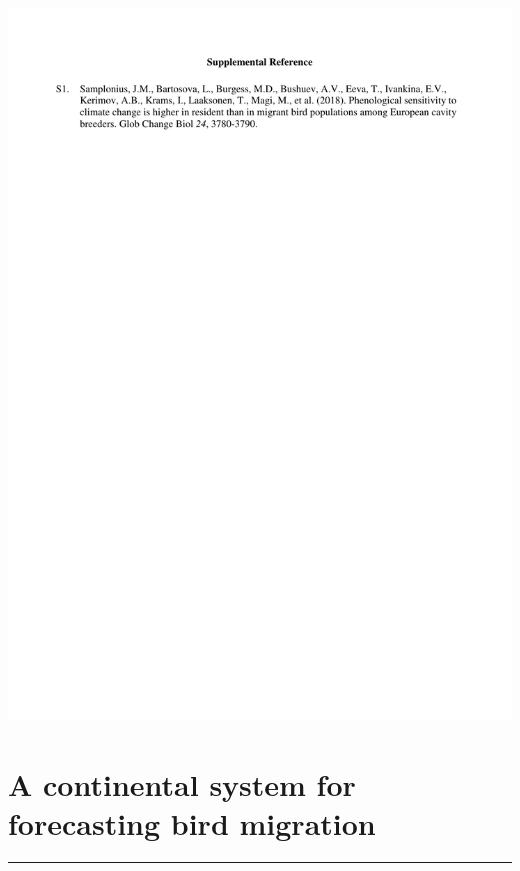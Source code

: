 \documentclass[a4paper, twoside]{templates/ociamthesis}
\begin{document}
\includegraphics[width=1\linewidth]{pdf_chapters/pied/pied_supp_crop_Part7}

\hypertarget{continental-system}{%
\chapter{A continental system for forecasting bird migration}\label{continental-system}}

\minitoc 

\begin{center}\rule{0.5\linewidth}{\linethickness}\end{center}
\end{document}
